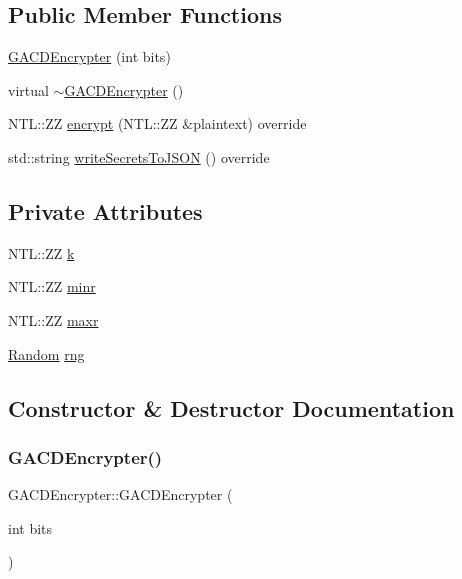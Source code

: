 \subsection*{Public Member Functions}
\begin{DoxyCompactItemize}
\item 
\hyperlink{classGACDEncrypter_a923b16f668dca6e17857df7c825ab66f}{G\+A\+C\+D\+Encrypter} (int bits)
\item 
virtual \hyperlink{classGACDEncrypter_a257b4b64e312222137fd351ce34fcf2e}{$\sim$\+G\+A\+C\+D\+Encrypter} ()
\item 
N\+T\+L\+::\+ZZ \hyperlink{classGACDEncrypter_a310a857f6b77a6c83d4319968d49902f}{encrypt} (N\+T\+L\+::\+ZZ \&plaintext) override
\item 
std\+::string \hyperlink{classGACDEncrypter_a01cd18ae81d0d28076c4ceb690a8b418}{write\+Secrets\+To\+J\+S\+ON} () override
\end{DoxyCompactItemize}
\subsection*{Private Attributes}
\begin{DoxyCompactItemize}
\item 
N\+T\+L\+::\+ZZ \hyperlink{classGACDEncrypter_af235b4e988a563f05d29b461c88f8703}{k}
\item 
N\+T\+L\+::\+ZZ \hyperlink{classGACDEncrypter_a6b0e9a07d27ec0976cc7958df6f666a4}{minr}
\item 
N\+T\+L\+::\+ZZ \hyperlink{classGACDEncrypter_a646b9daae82d6666d6a8affd3de41fd5}{maxr}
\item 
\hyperlink{classRandom}{Random} \hyperlink{classGACDEncrypter_a3f8959f045b15262ae7d680b35d0815c}{rng}
\end{DoxyCompactItemize}


\subsection{Constructor \& Destructor Documentation}
\mbox{\label{classGACDEncrypter_a923b16f668dca6e17857df7c825ab66f}} 
\subsubsection{\texorpdfstring{G\+A\+C\+D\+Encrypter()}{GACDEncrypter()}}
{\footnotesize\ttfamily G\+A\+C\+D\+Encrypter\+::\+G\+A\+C\+D\+Encrypter (\begin{DoxyParamCaption}\item[{int}]{bits }\end{DoxyParamCaption})}

